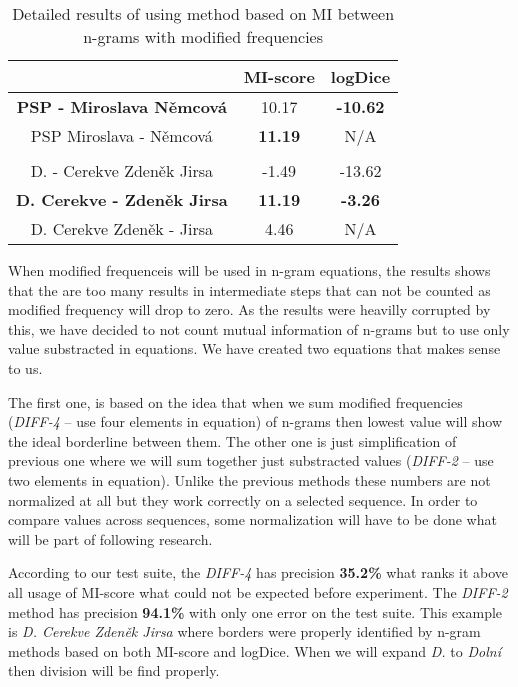 \documentclass[runningheads]{llncs}
\begin{document}
\begin{table}[h] 
\caption{Detailed results of using method based on MI between n-grams with
modified frequencies}
\label{negative-n-gram}
\begin{center} \begin{tabular}{|c|c|c|} \hline
 & MI-score & logDice \\ \hline
{\bf PSP - Miroslava N\v{e}mcov\'{a}} & 10.17 & {\bf -10.62} \\ \hline
PSP Miroslava - N\v{e}mcov\'{a} & {\bf 11.19} & N/A \\ \hline
& & \\ \hline
D. - Cerekve Zden\v{e}k Jirsa & -1.49 & -13.62 \\ \hline
{\bf D. Cerekve - Zden\v{e}k Jirsa} & {\bf 11.19} & {\bf -3.26} \\ \hline
D. Cerekve Zden\v{e}k - Jirsa & 4.46 & N/A \\ \hline
\end{tabular} \end{center} \end{table}

When modified frequenceis will be used in n-gram equations, the results shows that
the are too many results in intermediate steps that can not be counted as
modified frequency will drop to zero. As the results were heavilly corrupted by this,
we have decided to not count mutual information of n-grams but to use only
value substracted in equations. We have created two equations that makes
sense to us.

The first one, is based on the idea that when we sum modified frequencies
({\em DIFF-4} -- use four elements in equation) of n-grams then lowest value
will show the ideal borderline between them.  The other one is just
simplification of previous one where we will sum together just substracted
values ({\em DIFF-2} -- use two elements in equation).
Unlike the previous methods these numbers are not normalized at
all but they work correctly on a selected sequence.  In order to compare
values across sequences, some normalization will have to be done what will
be part of following research.

According to our test suite, the {\em DIFF-4} has precision {\bf 35.2\%} what
ranks it above all usage of MI-score what could not be expected before
experiment. The {\em DIFF-2} method has precision {\bf 94.1\%} with only one
error on the test suite. This example is {\em D. Cerekve Zden\v{e}k Jirsa}
where borders were properly identified by n-gram methods based on both
MI-score and logDice. When we will expand {\em D.} to {\em Doln\'{i}} then
division will be find properly.
\end{document}
